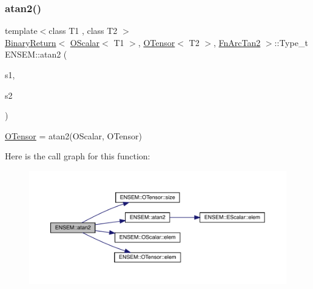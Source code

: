 \subsubsection{\texorpdfstring{atan2()}{atan2()}\hspace{0.1cm}{\footnotesize\ttfamily [3/3]}}
{\footnotesize\ttfamily template$<$class T1 , class T2 $>$ \\
\mbox{\hyperlink{structENSEM_1_1BinaryReturn}{Binary\+Return}}$<$ \mbox{\hyperlink{classENSEM_1_1OScalar}{O\+Scalar}}$<$ T1 $>$, \mbox{\hyperlink{classENSEM_1_1OTensor}{O\+Tensor}}$<$ T2 $>$, \mbox{\hyperlink{structENSEM_1_1FnArcTan2}{Fn\+Arc\+Tan2}} $>$\+::Type\+\_\+t E\+N\+S\+E\+M\+::atan2 (\begin{DoxyParamCaption}\item[{const \mbox{\hyperlink{classENSEM_1_1OScalar}{O\+Scalar}}$<$ T1 $>$ \&}]{s1,  }\item[{const \mbox{\hyperlink{classENSEM_1_1OTensor}{O\+Tensor}}$<$ T2 $>$ \&}]{s2 }\end{DoxyParamCaption})\hspace{0.3cm}{\ttfamily [inline]}}



\mbox{\hyperlink{classENSEM_1_1OTensor}{O\+Tensor}} = atan2(\+O\+Scalar, O\+Tensor) 

Here is the call graph for this function\+:\nopagebreak
\begin{figure}[H]
\begin{center}
\leavevmode
\includegraphics[width=350pt]{de/d87/group__obstensor_ga81f7f5b4d6ba20b09ce1c6a2f7284657_cgraph}
\end{center}
\end{figure}
\mbox{\label{group__obstensor_gaabe3804eba50d35ba93cf516f1e5a85b}} 
